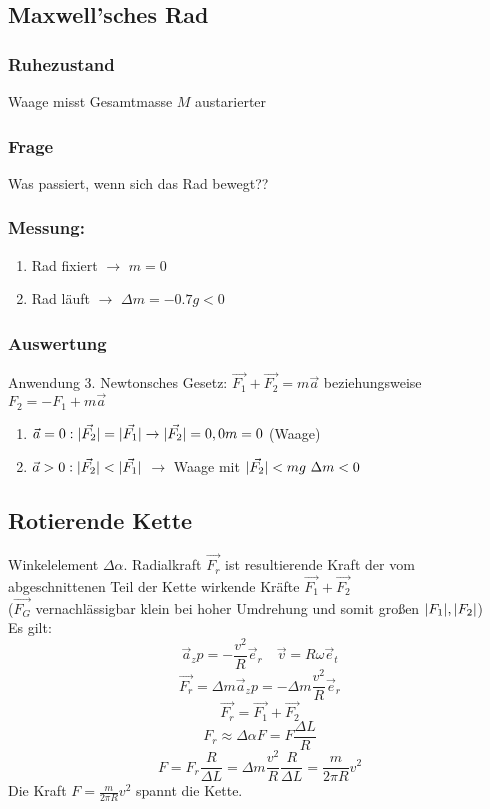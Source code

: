 \documentclass[a4paper]{scrartcl}
\DeclarePairedDelimiter\abs{\lvert}{\rvert}%
\renewcommand{\v}[1]{\vec{#1}}
\theoremstyle{definition}
\theoremstyle{plain}
\theoremstyle{plain}
\theoremstyle{remark}
\theoremstyle{remark}
\theoremstyle{remark}
\begin{document}
\subsection{Maxwell'sches Rad}
\label{sec-3-3}
\subsubsection{Ruhezustand}
\label{sec-3-3-1}
Waage misst Gesamtmasse $M$ austarierter
\subsubsection{Frage}
\label{sec-3-3-2}
Was passiert, wenn sich das Rad bewegt??
\subsubsection{Messung:}
\label{sec-3-3-3}
\begin{enumerate}
\item Rad fixiert $\rightarrow$ $m = 0$
\item Rad läuft $\rightarrow$ $\Delta m  = -0.7 g < 0$
\end{enumerate}
\subsubsection{Auswertung}
\label{sec-3-3-4}
Anwendung 3. Newtonsches Gesetz:
$\v{F_1} + \v{F_2} = m\v a$ beziehungsweise $F_2 = - F_1 + m\v a$
\begin{enumerate}
\item $\v a = 0: \abs{\v{F_2}} = \abs{\v{F_1}} \rightarrow \abs{\v{F_2}} = 0, 0 m = 0$ (Waage)
\item $\v a > 0: \abs{\v{F_2}} < \abs{\v{F_1}}$ $\rightarrow$ Waage mit $\abs{\v{F_2}} < m g~\Delta{m} < 0$
\end{enumerate}
\subsection{Rotierende Kette}
\label{sec-3-4}
Winkelelement $\Delta \alpha$. Radialkraft $\v{F_r}$ ist resultierende Kraft der vom abgeschnittenen Teil der Kette wirkende Kräfte $\v{F_1} + \v{F_2}$ \\
   ($\v{F_G}$ vernachlässigbar klein bei hoher Umdrehung und somit großen $\abs{F_1},\abs{F_2}$) \\
   Es gilt:
\[\v a_zp = -\frac{v^2}{R}\v e_r\quad \v v = R\omega \v e_t\]
\[\v{F_r} = \Delta m \v a_zp = -\Delta m \frac{v^2}{R}\v e_r\]
\[\v{F_r} = \v{F_1} + \v{F_2}\]
\[F_r \approx \Delta \alpha F = F\frac{\Delta L}{R}\]
\[F = F_r \frac{R}{\Delta L} = \Delta m \frac{v^2}{R}\frac{R}{\Delta L} = \frac{m}{2\pi R}v^2\]
Die Kraft $F = \frac{m}{2\pi R}v^2$ spannt die Kette.
\end{document}
